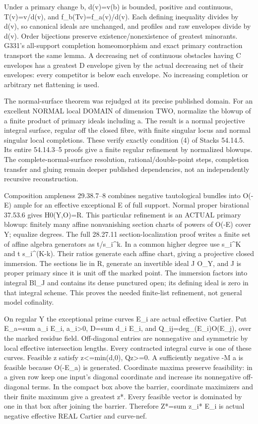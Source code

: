 \documentclass[11pt]{article}
\begin{document}
Under a primary change b, d(v)=v(b) is bounded, positive and continuous, T(v)=v/d(v), and f\_b(Tv)=f\_a(v)/d(v). Each defining inequality divides by d(v), so canonical ideals are unchanged, and profiles and raw envelopes divide by d(v). Order bijections preserve existence/nonexistence of greatest minorants. G331's all-support completion homeomorphism and exact primary contraction transport the same lemma. A decreasing net of continuous obstacles having C envelopes has a greatest D envelope given by the actual decreasing net of their envelopes: every competitor is below each envelope. No increasing completion or arbitrary net flattening is used.

The normal-surface theorem was rejudged at its precise published domain. For an excellent NORMAL local DOMAIN of dimension TWO, normalize the blowup of a finite product of primary ideals including a. The result is a normal projective integral surface, regular off the closed fibre, with finite singular locus and normal singular local completions. These verify exactly condition (4) of Stacks 54.14.5. Its entire 54.14.3--5 proofs give a finite regular refinement by normalized blowups. The complete-normal-surface resolution, rational/double-point steps, completion transfer and gluing remain deeper published dependencies, not an independently recursive reconstruction.

Composition ampleness 29.38.7--8 combines negative tautological bundles into O(-E) ample for an effective exceptional E of full support. Normal proper birational 37.53.6 gives H0(Y,O)=R. This particular refinement is an ACTUAL primary blowup: finitely many affine nonvanishing section charts of powers of O(-E) cover Y; equalize degrees. The full 28.27.11 section-localization proof writes a finite set of affine algebra generators as t/s\_i\textasciicircum{}k. In a common higher degree use s\_i\textasciicircum{}K and t s\_i\textasciicircum{}(K-k). Their ratios generate each affine chart, giving a projective closed immersion. The sections lie in R, generate an invertible ideal J O\_Y, and J is proper primary since it is unit off the marked point. The immersion factors into integral Bl\_J and contains its dense punctured open; its defining ideal is zero in that integral scheme. This proves the needed finite-list refinement, not general model cofinality.

On regular Y the exceptional prime curves E\_i are actual effective Cartier. Put E\_a=sum a\_i E\_i, a\_i\textgreater{}0, D=sum d\_i E\_i, and Q\_ij=deg\_(E\_i)O(E\_j), over the marked residue field. Off-diagonal entries are nonnegative and symmetric by local effective intersection lengths. Every contracted integral curve is one of these curves. Feasible z satisfy z\textless{}=min(d,0), Qz\textgreater{}=0. A sufficiently negative -M a is feasible because O(-E\_a) is generated. Coordinate maxima preserve feasibility: in a given row keep one input's diagonal coordinate and increase its nonnegative off-diagonal terms. In the compact box above the barrier, coordinate maximizers and their finite maximum give a greatest z*. Every feasible vector is dominated by one in that box after joining the barrier. Therefore Z*=sum z\_i* E\_i is actual negative effective REAL Cartier and curve-nef.
\end{document}
